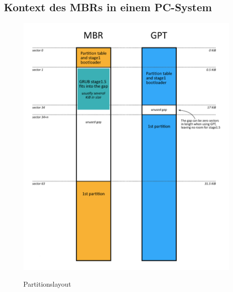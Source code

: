 \documentclass[11pt,a4paper]{article}
\begin{document}
\subsection{Kontext des MBRs in einem PC-System}
\begin{figure}[h]
	\caption{Partitionslayout}
	\includegraphics[scale=0.78]{images/mbr_partition_layout.png}
	\label{fig:part_layout}
\end{figure}

\pagebreak{}
\end{document}
